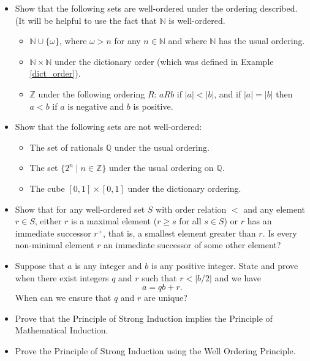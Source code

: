 \begin{itemize}
\item Show that the following sets are well-ordered under the ordering described. (It will be helpful to use the fact that $\mathbb{N}$ is well-ordered.
	\begin{itemize}
		\item $\mathbb{N} \cup \{\omega\}$, where $\omega > n$ for any $n \in \mathbb{N}$ and where $\mathbb{N}$ has the usual ordering.
		\item $\mathbb{N} \times \mathbb{N}$ under the dictionary order (which was defined in Example \ref{dict_order}). 
		\item $\mathbb{Z}$ under the following ordering $R$: $aRb$ if $|a| < |b|$, and if $|a| = |b|$ then $a < b$ if $a$ is negative and $b$ is positive.
	\end{itemize}
	
\item Show that the following sets are not well-ordered:
	\begin{itemize}
		\item The set of rationals $\mathbb{Q}$ under the usual ordering.
		\item The set $\{2^n \mid n \in \mathbb{Z}\}$ under the usual ordering on $\mathbb{Q}$.
		\item The cube $[0, 1] \times [0, 1]$ under the dictionary ordering.
	\end{itemize}
	
\item Show that for any well-ordered set $S$ with order relation $<$ and any element $r \in S$, either $r$ is a maximal element ($r \geq s$ for all $s \in S$) or $r$ has an immediate successor $r^{+}$, that is, a smallest element greater than $r$. Is every non-minimal element $r$ an immediate successor of some other element?

\item Suppose that $a$ is any integer and $b$ is any positive integer. State and prove when there exist integers $q$ and $r$ such that $r < |b/2|$ and we have 
\[a = qb + r.\]
When can we ensure that $q$ and $r$ are unique?

\item Prove that the Principle of Strong Induction implies the Principle of Mathematical Induction.

\item Prove the Principle of Strong Induction using the Well Ordering Principle.


\end{itemize}
